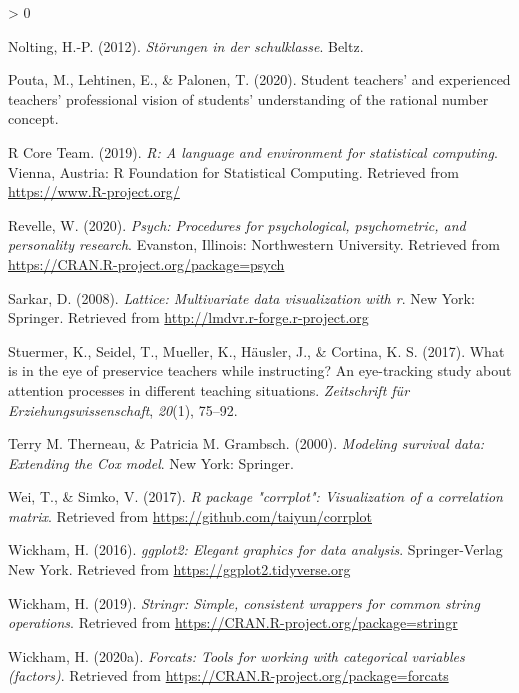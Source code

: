 \documentclass[
  english,
  man,floatsintext]{apa6}
\newlength{\cslhangindent}
\newenvironment{CSLReferences}[2] %
 {%
  \setlength{\parindent}{0pt}
  \ifodd #1 \everypar{\setlength{\hangindent}{\cslhangindent}}\ignorespaces\fi
  \ifnum #2 > 0
  \setlength{\parskip}{#2\baselineskip}
  \fi
 }%
 {}
\begin{document}
\begin{CSLReferences}{1}{0}
\leavevmode\hypertarget{ref-nolting2012storungen}{}%
Nolting, H.-P. (2012). \emph{St{ö}rungen in der schulklasse}. Beltz.

\leavevmode\hypertarget{ref-pouta2020student}{}%
Pouta, M., Lehtinen, E., \& Palonen, T. (2020). Student teachers' and experienced teachers' professional vision of students' understanding of the rational number concept.

\leavevmode\hypertarget{ref-R-base}{}%
R Core Team. (2019). \emph{R: A language and environment for statistical computing}. Vienna, Austria: R Foundation for Statistical Computing. Retrieved from \url{https://www.R-project.org/}

\leavevmode\hypertarget{ref-R-psych}{}%
Revelle, W. (2020). \emph{Psych: Procedures for psychological, psychometric, and personality research}. Evanston, Illinois: Northwestern University. Retrieved from \url{https://CRAN.R-project.org/package=psych}

\leavevmode\hypertarget{ref-R-lattice}{}%
Sarkar, D. (2008). \emph{Lattice: Multivariate data visualization with r}. New York: Springer. Retrieved from \url{http://lmdvr.r-forge.r-project.org}

\leavevmode\hypertarget{ref-stuermer2017eye}{}%
Stuermer, K., Seidel, T., Mueller, K., Häusler, J., \& Cortina, K. S. (2017). What is in the eye of preservice teachers while instructing? An eye-tracking study about attention processes in different teaching situations. \emph{Zeitschrift f{ü}r Erziehungswissenschaft}, \emph{20}(1), 75--92.

\leavevmode\hypertarget{ref-R-survival-book}{}%
Terry M. Therneau, \& Patricia M. Grambsch. (2000). \emph{Modeling survival data: Extending the {C}ox model}. New York: Springer.

\leavevmode\hypertarget{ref-R-corrplot2017}{}%
Wei, T., \& Simko, V. (2017). \emph{R package "corrplot": Visualization of a correlation matrix}. Retrieved from \url{https://github.com/taiyun/corrplot}

\leavevmode\hypertarget{ref-R-ggplot2}{}%
Wickham, H. (2016). \emph{ggplot2: Elegant graphics for data analysis}. Springer-Verlag New York. Retrieved from \url{https://ggplot2.tidyverse.org}

\leavevmode\hypertarget{ref-R-stringr}{}%
Wickham, H. (2019). \emph{Stringr: Simple, consistent wrappers for common string operations}. Retrieved from \url{https://CRAN.R-project.org/package=stringr}

\leavevmode\hypertarget{ref-R-forcats}{}%
Wickham, H. (2020a). \emph{Forcats: Tools for working with categorical variables (factors)}. Retrieved from \url{https://CRAN.R-project.org/package=forcats}


\end{CSLReferences}
\end{document}
